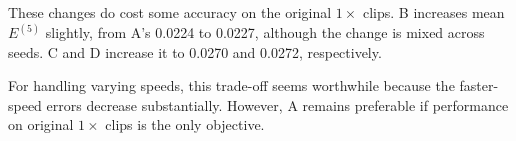 These changes do cost some accuracy on the original $1\times$ clips. B increases mean $E^{(5)}$ slightly, from A's 0.0224 to 0.0227, although the change is mixed across seeds. C and D increase it to 0.0270 and 0.0272, respectively.

For handling varying speeds, this trade-off seems worthwhile because the faster-speed errors decrease substantially. However, A remains preferable if performance on original $1\times$ clips is the only objective.
